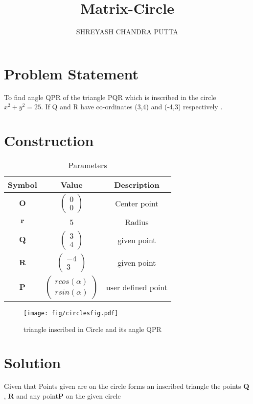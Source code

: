 \documentclass[journal,12pt,twocolumn]{article}
\title{Matrix-Circle}
\author{SHREYASH CHANDRA PUTTA}
\newcommand{\myvec}[1]{\ensuremath{\begin{pmatrix}#1\end{pmatrix}}}
\let\vec\mathbf
\let\vec\mathbf
\begin{document}
\maketitle
\tableofcontents
\bigskip
\section{Problem Statement}
To find angle QPR of the triangle PQR which is inscribed in the circle $x^2 + y^2 = 25$. If Q and R  have  co-ordinates (3,4) and (-4,3) respectively .
\section{Construction}
 {\begin{table}[h]
    \centering
    \begin{tabular}{|c|c|c|}
       \hline
       \textbf{Symbol}&\textbf{Value}&\textbf{Description}  \\
       \hline
       $\vec{O}$ & $\myvec{
		    0\\
		    0}$
	    & Center point\\
        \hline
        $\vec{r}$ & 5
	    & Radius\\
        \hline
	    $\vec{Q}$ & $\myvec{
		    3\\
		    4}$
	    & given point\\
        \hline
	    $\vec{R}$ & $\myvec{-4\\3}$
 & given point\\
        \hline
	    $\vec{P}$ & $\myvec{rcos(\alpha)\\
  rsin(\alpha)}$
 & user defined point \\
       \hline
    \end{tabular}
    \caption{Parameters}
    \label{tab:my_label}
\end{table}}
\begin{figure}[h]
    \centering
\texttt{[image: fig/circlesfig.pdf]}
    \caption{triangle inscribed in Circle and its angle QPR }
    \label{fig:my_label}
\end{figure}
\vspace{0cm}
\section{Solution}
Given that Points given are on the circle forms an inscribed triangle the points $\vec{Q}$, $\vec{R}$ and any point$\vec{P}$ on the given circle   \\
\end{document}
